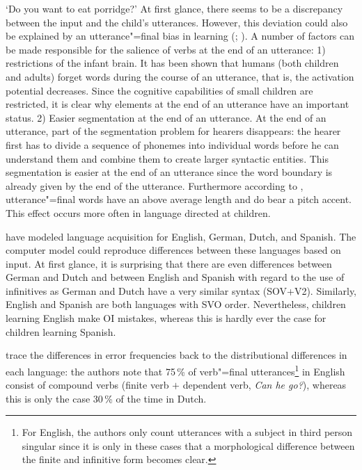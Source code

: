 \glt `Do you want to eat porridge?'
\z
\largerpage
At first glance, there seems to be a discrepancy between the input and the child's utterances.
However, this deviation could also be explained by an utterance"=final bias in learning (\citealp{WKG2001a}; \citealp*{FPG2006a}).
A number of factors can be made responsible for the salience of verbs at the end of an utterance:
1) restrictions of the infant brain. It has been shown that humans (both children and adults) forget words during the course of an
utterance, that is, the activation potential decreases. Since the cognitive capabilities of small children are restricted,
it is clear why elements at the end of an utterance have an important status. 2) Easier segmentation at
the end of an utterance. At the end of an utterance, part of the segmentation problem for hearers disappears:
the hearer first has to divide a sequence of phonemes into individual words before he can understand them and
combine them to create larger syntactic entities.
This segmentation is easier at the end of an utterance since the word boundary is already given by the end of the utterance.
Furthermore according to \citet*[]{WKG2001a}, utterance"=final words have an above average length and do bear a pitch
accent. This effect occurs more often in language directed at children.

\citet*{FPAG2007a} have modeled language acquisition for English, German, Dutch, and Spanish.
The computer model could reproduce differences between these languages based on input. At first glance, it
is surprising that there are even differences between German and Dutch and between English and Spanish with regard to the use of infinitives as
German and Dutch have a very similar syntax (SOV+V2). Similarly, English and Spanish are both languages with SVO order.
Nevertheless, children learning English make OI mistakes, whereas this is hardly ever the case for children learning Spanish.

\citet*{FPAG2007a} trace the differences in error frequencies back to the distributional differences in each language:
the authors note that 75\,\% of verb"=final utterances\footnote{%
	For English, the authors only count utterances with a subject in third person singular since it is only in these cases
	that a morphological difference between the finite and infinitive form becomes clear.%
}
in English consist of compound verbs (finite verb $+$ dependent verb, \eg \emph{Can he go?}), whereas this is only the case
30\,\% of the time in Dutch.

